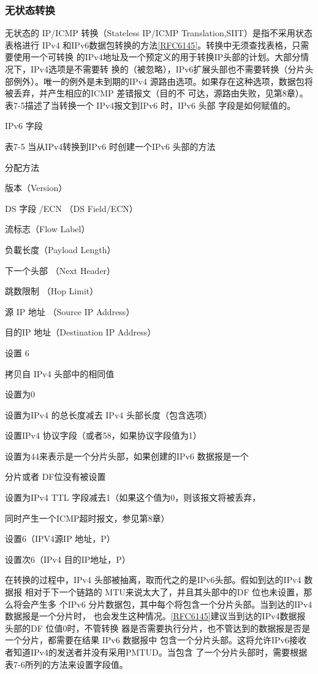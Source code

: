 \subsubsection{无状态转换}

无状态的 IP/ICMP 转换（Stateless IP/ICMP Translation,SIIT）是指不采用状态表格进行
IPv4 和IPv6数据包转换的方法\href{https://www.rfc-editor.org/rfc/rfc6145}{[RFC6145]}。转换中无须查找表格，只需要使用一个可转换
的IPv4地址及一个预定义的用于转换IP头部的计划。大部分情况下，IPv4选项是不需要转
换的（被忽略），IPv6扩展头部也不需要转换（分片头部例外）。唯一的例外是未到期的IPv4
源路由选项。如果存在这种选项，数据包将被丢弃，并产生相应的ICMP 差错报文（目的不
可达，源路由失败，见第8章）。表7-5描述了当转换一个 IPv4报文到IPv6 时，IPv6 头部
字段是如何赋值的。

IPv6 字段

表7-5 当从IPv4转换到IPv6 时创建一个IPv6 头部的方法

分配方法

版本（Version）

DS 字段 /ECN （DS Field/ECN）

流标志（Flow Label）

负載长度（Payload Length）

下一个头部 （Next Header）

跳数限制 （Hop Limit）

源 IP 地址 （Source IP Address）

目的IP 地址（Destination IP Address）

设置 6

拷贝自 IPv4 头部中的相同值

设置为0

设置为IPv4 的总长度减去 IPv4 头部长度（包含选项）

设置IPv4 协议字段（或者58，如果协议字段值为1）

设置为44来表示是一个分片头部，如果创建的IPv6 数据报是一个

分片或者 DF位没有被设置

设置为IPv4 TTL 字段减去1（如果这个值为0，则该报文将被丢弃，

同时产生一个ICMP超时报文，参见第8章）

设置6（IPV4源IP 地址，P）

设置次6（IPv4 目的IP地址，P）

在转换的过程中，IPv4 头部被抽离，取而代之的是IPv6头部。假如到达的IPv4 数据报
相对于下一个链路的 MTU来说太大了，并且其头部中的DF 位也未设置，那么将会产生多
个IPv6 分片数据包，其中每个将包含一个分片头部。当到达的IPv4数据报是一个分片时，
也会发生这种情况。\href{https://www.rfc-editor.org/rfc/rfc6145}{[RFC6145]}建议当到达的IPv4数据报头部的DF 位值0时，不管转换
器是否需要执行分片，也不管达到的数据报是否是一个分片，都需要在结果 IPv6 数据报中
包含一个分片头部。这将允许IPv6接收者知道IPv4的发送者并没有采用PMTUD。当包含
了一个分片头部时，需要根据表7-6所列的方法来设置字段值。

